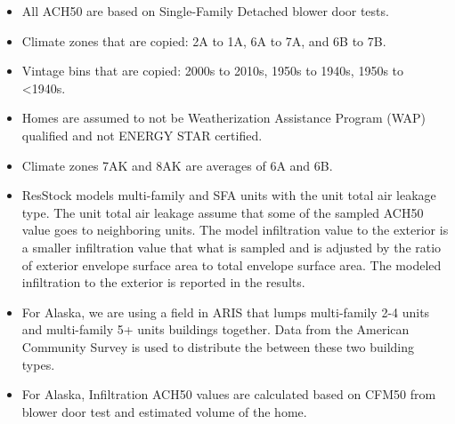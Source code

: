 \begin{itemize}
\item All ACH50 are based on Single-Family Detached blower door tests.
\item Climate zones that are copied: 2A to 1A, 6A to 7A, and 6B to 7B.
\item Vintage bins that are copied: 2000s to 2010s, 1950s to 1940s, 1950s to <1940s.
\item Homes are assumed to not be Weatherization Assistance Program (WAP) qualified and not ENERGY STAR certified.
\item Climate zones 7AK and 8AK are averages of 6A and 6B.
\item ResStock models multi-family and SFA units with the unit total air leakage type. The unit total air leakage assume that some of the sampled ACH50 value goes to neighboring units. The model infiltration value to the exterior is a smaller infiltration value that what is sampled and is adjusted by the ratio of exterior envelope surface area to total envelope surface area. The modeled infiltration to the exterior is reported in the results.
\item For Alaska, we are using a field in ARIS that lumps multi-family 2-4 units and multi-family 5+ units buildings together. Data from the American Community Survey is used to distribute the between these two building types.
\item For Alaska, Infiltration ACH50 values are calculated based on CFM50 from blower door test and estimated volume of the home.
\end{itemize}
